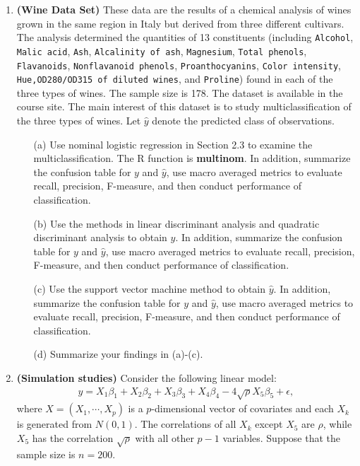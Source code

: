 \documentclass[11pt]{article}
\begin{document}
\begin{enumerate}

\item {\bf (Wine Data Set)} These data are the results of a chemical analysis of wines grown in the same region in Italy but derived from three different cultivars. The analysis determined the quantities of 13 constituents (including  {\tt Alcohol}, {\tt Malic acid}, {\tt Ash}, {\tt Alcalinity of ash}, {\tt Magnesium}, {\tt Total phenols}, {\tt Flavanoids}, {\tt Nonflavanoid phenols}, {\tt Proanthocyanins}, {\tt Color intensity}, {\tt Hue,OD280/OD315 of diluted wines}, and {\tt Proline}) found in each of the three types of wines. The sample size is 178. The dataset is available in the course site. The main interest of this dataset is to study multiclassification of the three types of wines. Let $\widehat{y}$ denote the predicted class of observations.

\begin{itemize}

\item[(a)] Use nominal logistic regression in Section 2.3 to examine the multiclassification. The R function is {\bf multinom}. In addition, summarize the confusion table for $y$ and $\widehat{y}$, use macro averaged metrics to evaluate recall, precision, F-measure, and then conduct performance of classification.

\item[(b)] Use the methods in linear discriminant analysis and quadratic discriminant analysis to obtain $\widehat{y}$. In addition, summarize the confusion table for $y$ and $\widehat{y}$, use macro averaged metrics to evaluate recall, precision, F-measure, and then conduct performance of classification.

\item[(c)] Use the support vector machine method to obtain $\widehat{y}$. In addition, summarize the confusion table for $y$ and $\widehat{y}$, use macro averaged metrics to evaluate recall, precision, F-measure, and then conduct performance of classification.


\item[(d)] Summarize your findings  in (a)-(c).

\end{itemize}



\clearpage

\item {\bf (Simulation studies)} Consider the following linear model:
\begin{eqnarray} \label{lm}
y = X_1 \beta_1 + X_2 \beta_2 + X_3 \beta_3 + X_4 \beta_4  - 4\sqrt{\rho} X_5 \beta_5 + \epsilon,
\end{eqnarray}
where $X = \left( X_1,\cdots,X_p \right)$ is a $p$-dimensional vector of covariates and each $X_k$ is generated from $N(0,1)$. The correlations of all $X_k$ except $X_5$ are $\rho$, while $X_5$ has the correlation $\sqrt{\rho}$ with all other $p-1$ variables. Suppose that the sample size is $n=200$.


\end{enumerate}
\end{document}
